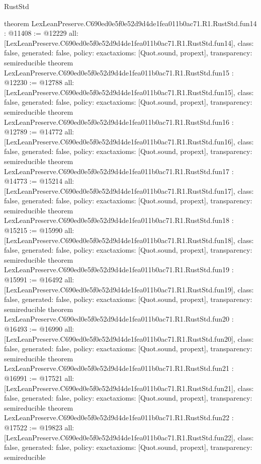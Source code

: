 \begin{lexlean}{RustStd}
\begin{coremodule}
{}
theorem LexLeanPreserve.C690ed0e5f0e52d9d4de1fea011b0ac71.R1.RustStd.fun14 : @11408 := @12229 {
  all: [LexLeanPreserve.C690ed0e5f0e52d9d4de1fea011b0ac71.R1.RustStd.fun14],
  class: false,
  generated: false,
  policy: exact{axioms: [Quot.sound, propext]},
  transparency: semireducible
}
theorem LexLeanPreserve.C690ed0e5f0e52d9d4de1fea011b0ac71.R1.RustStd.fun15 : @12230 := @12788 {
  all: [LexLeanPreserve.C690ed0e5f0e52d9d4de1fea011b0ac71.R1.RustStd.fun15],
  class: false,
  generated: false,
  policy: exact{axioms: [Quot.sound, propext]},
  transparency: semireducible
}
theorem LexLeanPreserve.C690ed0e5f0e52d9d4de1fea011b0ac71.R1.RustStd.fun16 : @12789 := @14772 {
  all: [LexLeanPreserve.C690ed0e5f0e52d9d4de1fea011b0ac71.R1.RustStd.fun16],
  class: false,
  generated: false,
  policy: exact{axioms: [Quot.sound, propext]},
  transparency: semireducible
}
theorem LexLeanPreserve.C690ed0e5f0e52d9d4de1fea011b0ac71.R1.RustStd.fun17 : @14773 := @15214 {
  all: [LexLeanPreserve.C690ed0e5f0e52d9d4de1fea011b0ac71.R1.RustStd.fun17],
  class: false,
  generated: false,
  policy: exact{axioms: [Quot.sound, propext]},
  transparency: semireducible
}
theorem LexLeanPreserve.C690ed0e5f0e52d9d4de1fea011b0ac71.R1.RustStd.fun18 : @15215 := @15990 {
  all: [LexLeanPreserve.C690ed0e5f0e52d9d4de1fea011b0ac71.R1.RustStd.fun18],
  class: false,
  generated: false,
  policy: exact{axioms: [Quot.sound, propext]},
  transparency: semireducible
}
theorem LexLeanPreserve.C690ed0e5f0e52d9d4de1fea011b0ac71.R1.RustStd.fun19 : @15991 := @16492 {
  all: [LexLeanPreserve.C690ed0e5f0e52d9d4de1fea011b0ac71.R1.RustStd.fun19],
  class: false,
  generated: false,
  policy: exact{axioms: [Quot.sound, propext]},
  transparency: semireducible
}
theorem LexLeanPreserve.C690ed0e5f0e52d9d4de1fea011b0ac71.R1.RustStd.fun20 : @16493 := @16990 {
  all: [LexLeanPreserve.C690ed0e5f0e52d9d4de1fea011b0ac71.R1.RustStd.fun20],
  class: false,
  generated: false,
  policy: exact{axioms: [Quot.sound, propext]},
  transparency: semireducible
}
theorem LexLeanPreserve.C690ed0e5f0e52d9d4de1fea011b0ac71.R1.RustStd.fun21 : @16991 := @17521 {
  all: [LexLeanPreserve.C690ed0e5f0e52d9d4de1fea011b0ac71.R1.RustStd.fun21],
  class: false,
  generated: false,
  policy: exact{axioms: [Quot.sound, propext]},
  transparency: semireducible
}
theorem LexLeanPreserve.C690ed0e5f0e52d9d4de1fea011b0ac71.R1.RustStd.fun22 : @17522 := @19823 {
  all: [LexLeanPreserve.C690ed0e5f0e52d9d4de1fea011b0ac71.R1.RustStd.fun22],
  class: false,
  generated: false,
  policy: exact{axioms: [Quot.sound, propext]},
  transparency: semireducible
}
\end{coremodule}
\end{lexlean}
